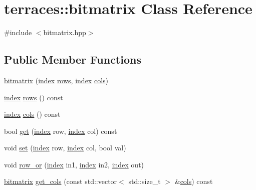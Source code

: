 \hypertarget{classterraces_1_1bitmatrix}{}\section{terraces\+:\+:bitmatrix Class Reference}
\label{classterraces_1_1bitmatrix}


{\ttfamily \#include $<$bitmatrix.\+hpp$>$}

\subsection*{Public Member Functions}
\begin{DoxyCompactItemize}
\item 
\hyperlink{classterraces_1_1bitmatrix_ab3210e10f4ffb9850325e93db17b9e0d}{bitmatrix} (\hyperlink{namespaceterraces_adbc33ccb543d1634e96d0eb02e472c77}{index} \hyperlink{classterraces_1_1bitmatrix_a7e19b0df5f60d1bd76cda27987bac1ad}{rows}, \hyperlink{namespaceterraces_adbc33ccb543d1634e96d0eb02e472c77}{index} \hyperlink{classterraces_1_1bitmatrix_a55c1ef8f0554b8b82c2f4f86e8d4a0ef}{cols})
\item 
\hyperlink{namespaceterraces_adbc33ccb543d1634e96d0eb02e472c77}{index} \hyperlink{classterraces_1_1bitmatrix_a7e19b0df5f60d1bd76cda27987bac1ad}{rows} () const
\item 
\hyperlink{namespaceterraces_adbc33ccb543d1634e96d0eb02e472c77}{index} \hyperlink{classterraces_1_1bitmatrix_a55c1ef8f0554b8b82c2f4f86e8d4a0ef}{cols} () const
\item 
bool \hyperlink{classterraces_1_1bitmatrix_aef01e1c2bc601f43786343adf8b3876e}{get} (\hyperlink{namespaceterraces_adbc33ccb543d1634e96d0eb02e472c77}{index} row, \hyperlink{namespaceterraces_adbc33ccb543d1634e96d0eb02e472c77}{index} col) const
\item 
void \hyperlink{classterraces_1_1bitmatrix_abced1ac3b008ea34b2917e5a4b82a7d4}{set} (\hyperlink{namespaceterraces_adbc33ccb543d1634e96d0eb02e472c77}{index} row, \hyperlink{namespaceterraces_adbc33ccb543d1634e96d0eb02e472c77}{index} col, bool val)
\item 
void \hyperlink{classterraces_1_1bitmatrix_a36a4964456f0d7f0eeb389e42124fa84}{row\+\_\+or} (\hyperlink{namespaceterraces_adbc33ccb543d1634e96d0eb02e472c77}{index} in1, \hyperlink{namespaceterraces_adbc33ccb543d1634e96d0eb02e472c77}{index} in2, \hyperlink{namespaceterraces_adbc33ccb543d1634e96d0eb02e472c77}{index} out)
\item 
\hyperlink{classterraces_1_1bitmatrix}{bitmatrix} \hyperlink{classterraces_1_1bitmatrix_a0da6fd3a2321c19fdb802ba825d83d24}{get\+\_\+cols} (const std\+::vector$<$ std\+::size\+\_\+t $>$ \&\hyperlink{classterraces_1_1bitmatrix_a55c1ef8f0554b8b82c2f4f86e8d4a0ef}{cols}) const
\end{DoxyCompactItemize}


